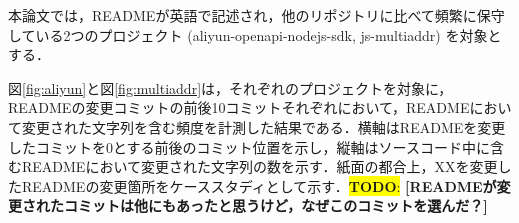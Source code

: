 \documentclass[uplatex,dvipdfmx,a4paper,twocolumn,base=11pt,jbase=11pt,ja=standard]{bxjsarticle}  %
\newcommand{\todo}[1]{\colorbox{yellow}{{\bf TODO}:}{\color{red} {\textbf{[#1]}}}}
\begin{document}

本論文では，READMEが英語で記述され，他のリポジトリに比べて頻繁に保守している2つのプロジェクト (aliyun-openapi-nodejs-sdk, js-multiaddr) を対象とする．


図\ref{fig:aliyun}と図\ref{fig:multiaddr}は，それぞれのプロジェクトを対象に，READMEの変更コミットの前後10コミットそれぞれにおいて，READMEにおいて変更された文字列を含む頻度を計測した結果である．横軸はREADMEを変更したコミットを0とする前後のコミット位置を示し，縦軸はソースコード中に含むREADMEにおいて変更された文字列の数を示す．紙面の都合上，XXを変更したREADMEの変更箇所をケーススタディとして示す．\todo{READMEが変更されたコミットは他にもあったと思うけど，なぜこのコミットを選んだ？}




\end{document}
